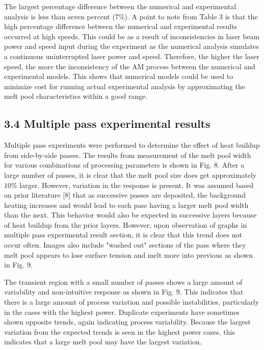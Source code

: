 \documentclass[10pt]{article}
\begin{document}
The largest percentage difference between the numerical and experimental analysis is less than seven percent (7\%). A point to note from Table 3 is that the high percentage difference between the numerical and experimental results occurred at high speeds. This could be as a result of inconsistencies in laser beam power and speed input during the experiment as the numerical analysis simulates a continuous uninterrupted laser power and speed. Therefore, the higher the laser speed, the more the inconsistency of the AM process between the numerical and experimental models. This shows that numerical models could be used to minimize cost for running actual experimental analysis by approximating the melt pool characteristics within a good range.

\subsection*{3.4 Multiple pass experimental results}
Multiple pass experiments were performed to determine the effect of heat buildup from side-by-side passes. The results from measurement of the melt pool width for various combinations of processing parameters is shown in Fig. 8. After a large number of passes, it is clear that the melt pool size does get approximately $10 \%$ larger. However, variation in the response is present. It was assumed based on prior literature [8] that as successive passes are deposited, the background heating increases and would lead to each pass having a larger melt pool width than the next. This behavior would also be expected in successive layers because of heat buildup from the prior layers. However, upon observation of graphs in multiple pass experimental result section, it is clear that this trend does not occur often. Images also include "washed out" sections of the pass where they melt pool appears to lose surface tension and melt more into previous as shown in Fig. 9.

The transient region with a small number of passes shows a large amount of variability and non-intuitive response as shown in Fig. 9. This indicates that there is a large amount of process variation and possible instabilities, particularly in the cases with the highest power. Duplicate experiments have sometimes shown opposite trends, again indicating process variability. Because the largest variation from the expected trends is seen in the highest power cases, this indicates that a large melt pool may have the largest variation.
\end{document}
